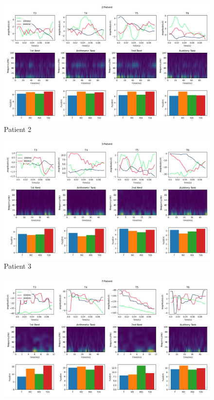 \documentclass[10pt]{article}
\begin{document}
\begin{landscape}
\clearpage
\begin{figure}
  \includegraphics[width=7.2in]{figures/2.png}
  \caption{Patient 2}
  \label{fig:patient_2}
\end{figure}
\clearpage
\begin{figure}
  \includegraphics[width=7.2in]{figures/3.png}
  \caption{Patient 3}
  \label{fig:patient_3}
\end{figure}
\clearpage
\begin{figure}
  \includegraphics[width=7.2in]{figures/7.png}

\end{figure}
\end{landscape}
\end{document}
